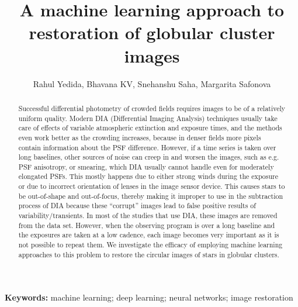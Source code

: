 \documentclass[12pt,a4paper]{article}
\title{A machine learning approach to restoration of globular cluster images}
\author{Rahul Yedida, Bhavana KV, Snehanshu Saha, Margarita Safonova}
\date{}
\begin{document}
\maketitle
\begin{abstract}
Successful differential photometry of crowded fields requires images to be of a relatively uniform quality. Modern DIA (Differential Imaging Analysis) techniques usually take care of effects of variable atmospheric extinction and exposure times, and the methods even work better as the crowding increases, because in denser fields more pixels contain information about the PSF difference. However, if a time series is taken over long baselines, other sources of noise can creep in and worsen the images, such as e.g. PSF anisotropy, or smearing, which DIA usually cannot handle even for moderately elongated PSFs. This mostly happens due to either strong winds during the exposure or due to incorrect orientation of lenses in the image sensor device. This causes stars to be out-of-shape and out-of-focus, thereby making it improper to use in the subtraction process of DIA because these “corrupt” images lead to false positive results of variability/transients. In most of the studies that use DIA, these images are removed from the data set. However, when the observing program is over a long baseline and the exposures are taken at a low cadence, each image becomes very important as it is not possible to repeat them. We investigate the efficacy of employing machine learning approaches to this problem to restore the circular images of stars in globular clusters.
\end{abstract}
\textbf{Keywords:} machine learning; deep learning; neural networks; image restoration
\end{document}
